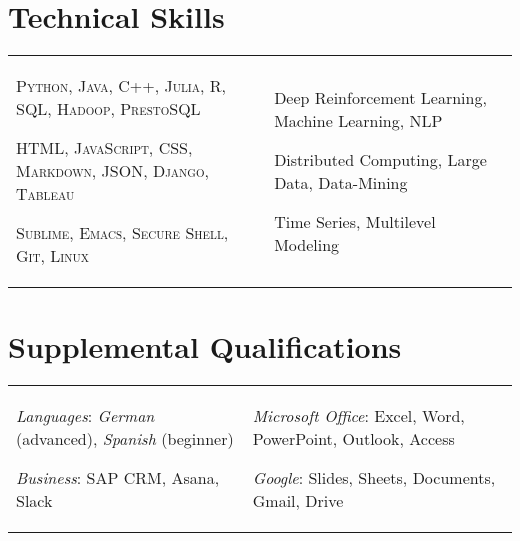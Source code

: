 \documentclass[a4paper,10pt]{article}
\begin{document}
\section{Technical Skills}
\begin{supertabular}{p{8.65cm} p{8.65cm}}

	\begin{enumerate*}[label =$\circ$, itemjoin={\newline}]
																\item \small \textsc{Python, Java, C++, Julia, R, SQL, Hadoop, PrestoSQL}
																\item \small \textsc{HTML, JavaScript, CSS, Markdown, JSON, Django, Tableau}
																\item \small \textsc{Sublime, Emacs, Secure Shell, Git, Linux}
																\end{enumerate*}


	& \begin{enumerate*}[label =$\circ$, itemjoin={\newline}]
                                \item \small Deep Reinforcement Learning, Machine Learning, NLP
                                \item \small Distributed Computing, Large Data, Data-Mining
                                \item \small Time Series, Multilevel Modeling \end{enumerate*}  \vspace{1mm} \\



\end{supertabular}



\section{Supplemental Qualifications}
\begin{supertabular}{p{8.65cm} p{8.65cm}}
	\begin{enumerate*}[label =$\circ$, itemjoin={\newline}]
		\item \small \emph{Languages}: \emph{German} (advanced), \emph{Spanish} (beginner)
	 	\item \small \emph{Business}: SAP CRM, Asana, Slack
	\end{enumerate*}

	& \begin{enumerate*}[label =$\circ$, itemjoin={\newline}]
	 	\item \small \emph{Microsoft Office}: Excel, Word, PowerPoint, Outlook, Access
	 	\item \small \emph{Google}: Slides, Sheets, Documents, Gmail, Drive
	\end{enumerate*} \\

\end{supertabular}
\end{document}
